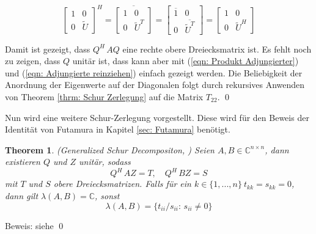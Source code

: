 \documentclass[a4paper,12pt]{report}
\newcommand{\C}{\mathbb C}
\theoremstyle{plain} %
\newtheorem{theorem}{Theorem}
\theoremstyle{definition} %
\theoremstyle{remark}
\begin{document}
           \begin{equation}
            \label{eqn: Adjungierte reinziehen}
                  \begin{bmatrix}
                        1&0\\
                        0&\widetilde U
                  \end{bmatrix}^H = \overline{\begin{bmatrix}
                        1&0\\
                        0&\widetilde U^T
                  \end{bmatrix}} = \begin{bmatrix}
                        \overline{1}&0\\
                        0&\overline{\widetilde U^T}
                  \end{bmatrix} = \begin{bmatrix}
                        1&0\\
                        0&\widetilde U^H
                  \end{bmatrix}
           \end{equation}

            Damit ist gezeigt, dass $Q^H\,AQ$ eine rechte obere Dreiecksmatrix ist.
            Es fehlt noch zu zeigen, dass $Q$ unitär ist, dass kann aber mit (\ref{eqn: Produkt Adjungierter}) und (\ref{eqn: Adjungierte reinziehen}) einfach gezeigt werden.
            Die Beliebigkeit der Anordnung der Eigenwerte auf der Diagonalen folgt durch rekursives Anwenden von Theorem \ref{thrm: Schur Zerlegung} auf die Matrix $T_{22}$. \qed


            Nun wird eine weitere Schur-Zerlegung vorgestellt. Diese wird für den Beweis der Identität von Futamura in Kapitel \ref{sec: Futamura} benötigt.
            \begin{theorem}(Generalized Schur Decompositon, \cite[S. 377]{matrixGolub})
                  \label{thrm: allg Schur Zerlegung}
                  Seien $A, B \in \C^{n\times n}$, dann existieren $Q$ und $Z$ unitär, sodass
                  \begin{equation}
                        \label{eqn: allg Schur_Resultat}
                        Q^H\,AZ = T,\quad Q^H\, BZ = S
                  \end{equation}
                  mit $T$ und $S$ obere Dreiecksmatrizen.
                  Falls für ein $k\in \{1,..., n\}\ t_{kk}=s_{kk}=0$, dann gilt $\lambda(A, B) = \C$, sonst
                  \begin{equation}
                        \label{eqn: EW Pencil nach Schur}
                        \lambda(A, B) = \{t_{ii}/s_{ii}:\, s_{ii}\ne 0\}
                  \end{equation}
            \end{theorem}
            Beweis: siehe \cite[S. 377]{matrixGolub}\qed
\end{document}
